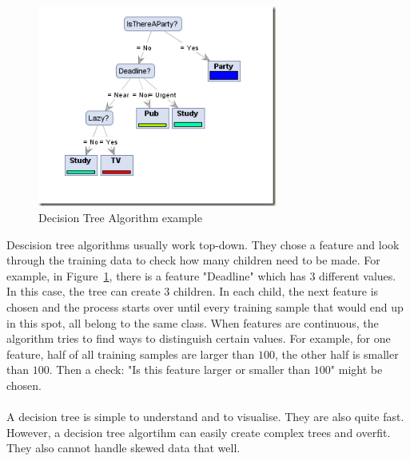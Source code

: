 \begin{figure}[H]
\centering
\includegraphics[width=0.7\textwidth]{Figures/decisiontreeExample}
\decoRule
\caption[Decision Tree Algorithm example]{Decision Tree Algorithm example \cite{decisiontreeExample}}
\label{fig:decisiontreeExample}
\end{figure}
\noindent Descision tree algorithms usually work top-down. They chose a feature and look through the training data to check how many children need to be made. For example, in Figure~\ref{fig:decisiontreeExample}, there is a feature "Deadline" which has $3$ different values. In this case, the tree can create $3$ children. In each child, the next feature is chosen and the process starts over until every training sample that would end up in this spot, all belong to the same class. When features are continuous, the algorithm tries to find ways to distinguish certain values. For example, for one feature, half of all training samples are larger than $100$, the other half is smaller than $100$. Then a check: "Is this feature larger or smaller than $100$" might be chosen. \\
\\
\noindent A decision tree is simple to understand and to visualise. They are also quite fast. However, a decision tree algortihm can easily create complex trees and overfit. They also cannot handle skewed data that well. \cite{decisiontree}

